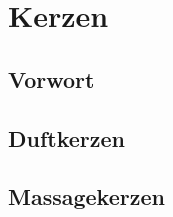 \chapter{Kerzen}


\section{Vorwort}


\lipsum[1-5]
\newpage



\section{Duftkerzen}


\section{Massagekerzen}
